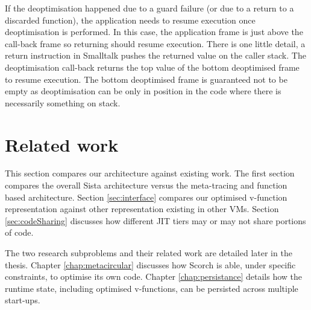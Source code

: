 \documentclass[a4paper,12pt,twoside]{../includes/ThesisStyle}
\begin{document}
If the deoptimisation happened due to a guard failure (or due to a return to a discarded function), the application needs to resume execution once deoptimisation is performed. In this case, the application frame is just above the call-back frame so returning should resume execution. There is one little detail, a return instruction in Smalltalk pushes the returned value on the caller stack. The deoptimisation call-back returns the top value of the bottom deoptimised frame to resume execution. The bottom deoptimised frame is guaranteed not to be empty as deoptimisation can be only in position in the code where there is necessarily something on stack.




\section{Related work}
\label{sec:relatedWorkArch}

This section compares our architecture against existing work. The first section compares the overall Sista architecture versus the meta-tracing and function based architecture. Section \ref{sec:interface} compares our optimised v-function representation against other representation existing in other VMs. Section \ref{sec:codeSharing} discusses how different JIT tiers may or may not share portions of code.

The two research subproblems and their related work are detailed later in the thesis. Chapter \ref{chap:metacircular} discusses how Scorch is able, under specific constraints, to optimise its own code. Chapter \ref{chap:persistance} details how the runtime state, including optimised v-functions, can be persisted across multiple start-ups.
\end{document}
